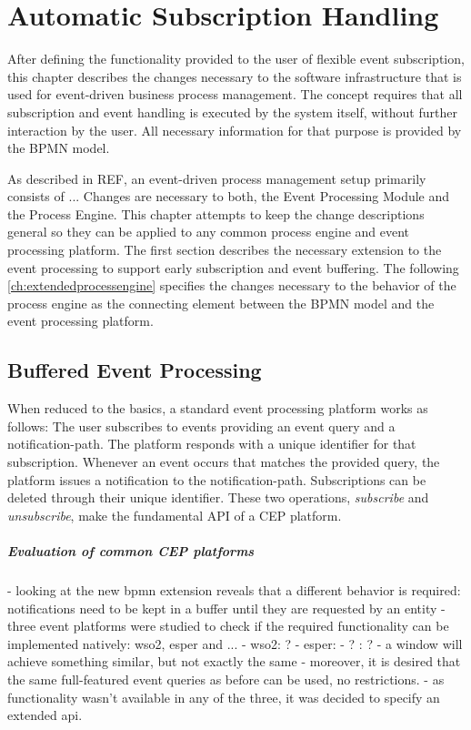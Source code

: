 \chapter{Automatic Subscription Handling}\label{ch:automaticsubscription}

After defining the functionality provided to the user of flexible event subscription, this chapter describes the changes necessary to the software infrastructure that is used for event-driven business process management.
The concept requires that all subscription and event handling is executed by the system itself, without further interaction by the user.
All necessary information for that purpose is provided by the BPMN model.

As described in REF, an event-driven process management setup primarily consists of ...
Changes are necessary to both, the Event Processing Module and the Process Engine. This chapter attempts to keep the change descriptions general so they can be applied to any common process engine and event processing platform.
The first section describes the necessary extension to the event processing to support early subscription and event buffering.
The following \autoref{ch:extendedprocessengine} specifies the changes necessary to the behavior of the process engine as the connecting element between the BPMN model and the event processing platform.


\section{Buffered Event Processing}\label{ch:bufferedcep}
When reduced to the basics, a standard event processing platform works as follows: The user subscribes to events providing an event query and a notification-path. The platform responds with a unique identifier for that subscription.
Whenever an event occurs that matches the provided query, the platform issues a notification to the notification-path. Subscriptions can be deleted through their unique identifier.
These two operations, \textit{subscribe} and \textit{unsubscribe}, make the fundamental API of a CEP platform.


\paragraph{Evaluation of common CEP platforms}
- looking at the new bpmn extension reveals that a different behavior is required: notifications need to be kept in a buffer until they are requested by an entity
- three event platforms were studied to check if the required functionality can be implemented natively: wso2, esper and ...
- wso2: ?
- esper: 
- ? : ?
- a window will achieve something similar, but not exactly the same
- moreover, it is desired that the same full-featured event queries as before can be used, no restrictions. 
- as functionality wasn't available in any of the three, it was decided to specify an extended api.

